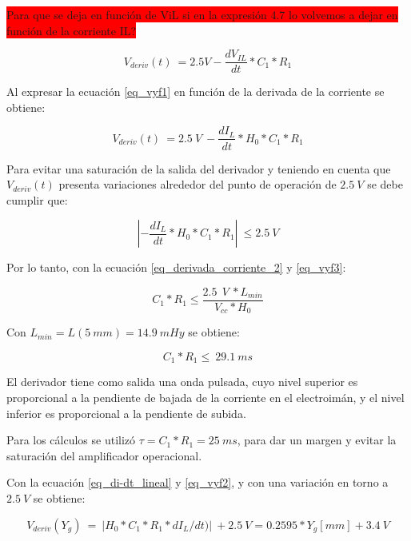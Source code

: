 \colorbox{red}{Para que se deja en función de ViL si en la expresión 4.7 lo volvemos a dejar en función de la corriente IL?}

\begin{equation} \label{eq_vyf1}
	V_{deriv}(t)\ = 2.5V - \frac{dV_{IL}}{dt}*C_1*R_1
\end{equation}

Al expresar la ecuación \ref{eq_vyf1} en función de la derivada de la corriente se obtiene:

\begin{equation} \label{eq_vyf2}
	V_{deriv}(t)\ =2.5\:V\ -\frac{dI_L}{dt}*H_0*C_1*R_1
\end{equation}

Para evitar una saturación de la salida del derivador y teniendo en cuenta que $V_{deriv}(t)$ presenta variaciones alrededor del punto de operación de $2.5\:V$ se debe cumplir que:

\begin{equation} \label{eq_vyf3}
	\left|-\frac{dI_L}{dt}*H_0*C_1*R_1\right|\ \le 2.5\:V
\end{equation}

Por lo tanto, con la ecuación \ref{eq_derivada_corriente_2} y \ref{eq_vyf3}:

\begin{equation} \label{eq_condicionC1-R1}
	C_1*R_1\le\frac{2.5\ \:V\ *L_{min}}{V_{cc}*H_0}
\end{equation}

Con $L_{min}= L(5\: mm) = 14.9\: mHy$ se obtiene: 

\begin{equation} \label{eq_condicionC1-R1-2}
	C_1*R_1\le\ 29.1\ ms
\end{equation}

El derivador tiene como salida una onda pulsada, cuyo nivel superior es proporcional a la pendiente de bajada de la corriente en el electroimán, y el nivel inferior es proporcional a la pendiente de subida.

Para los cálculos se utilizó $\tau = C_1*R_1= 25\:ms$, para dar un margen y evitar la saturación del amplificador operacional.  

Con la ecuación \ref{eq_di-dt_lineal} y \ref{eq_vyf2}, y con una variación en torno a $2.5\:V$ se obtiene:


\begin{equation} \label{eq_Vyf-lineal}
	V_{deriv}(Y_g)\ =\ |H_0*C_1*R_1*dI_L/dt)|\ +2.5\:V=0.2595*Y_g[mm]+3.4\:V
\end{equation}

